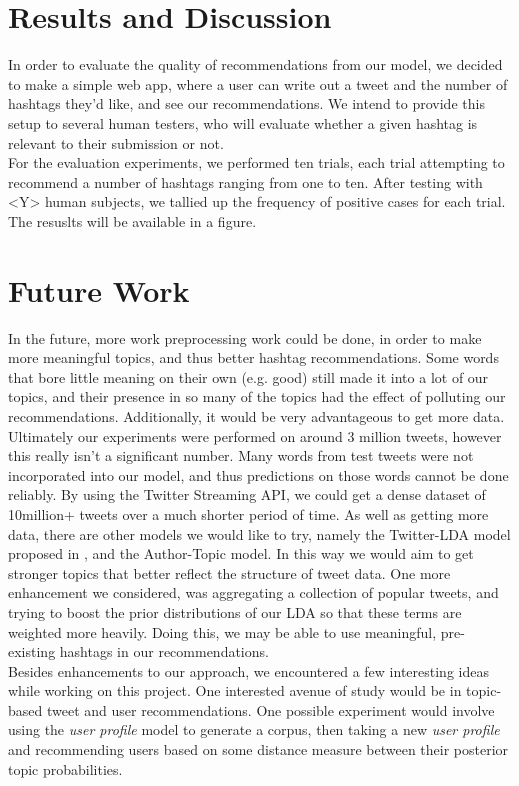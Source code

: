 \documentclass{acm_proc_article-sp}
\begin{document}
\section{Results and Discussion}
\hspace*{5mm}In order to evaluate the quality of recommendations from our model, we decided to make a  simple web app, where a user can write out a tweet and the number of hashtags they'd like, and see our recommendations. We intend to provide this setup to several human testers, who will evaluate whether a given hashtag is relevant to their submission or not.\\
\hspace*{5mm}For the evaluation experiments, we performed ten trials, each trial attempting to recommend a number of hashtags ranging from one to ten. After testing with <Y> human subjects, we tallied up the frequency of positive cases for each trial. The resuslts will be available in a figure. \\

\section{Future Work}
\hspace*{5mm}In the future, more work preprocessing work could be done, in order to make more meaningful topics, and thus better hashtag recommendations. Some words that bore little meaning on their own (e.g. good) still made it into a lot of our topics, and their presence in so many of the topics had the effect of polluting our recommendations. Additionally, it would be very advantageous to get more data. Ultimately our experiments were performed on around 3 million tweets, however this really isn't a significant number. Many words from test tweets were not incorporated into our model, and thus predictions on those words cannot be done reliably. By using the Twitter Streaming API, we could get a dense dataset of 10million+ tweets over a much shorter period of time. As well as getting more data, there are other models we would like to try, namely the Twitter-LDA model proposed in \cite{zhao2011comparing}, and the Author-Topic model. In this way we would aim to get stronger topics that better reflect the structure of tweet data. One more enhancement we considered, was aggregating a collection of popular tweets, and trying to boost the prior distributions of our LDA so that these terms are weighted more heavily. Doing this, we may be able to use meaningful, pre-existing hashtags in our recommendations.\\
\hspace*{5mm}Besides enhancements to our approach, we encountered a few interesting ideas while working on this project. One interested avenue of study would be in topic-based tweet and user recommendations. One possible experiment would involve using the \textit{user profile} model to generate a corpus, then taking a new \textit{user profile} and recommending users based on some distance measure between their posterior topic probabilities.
\end{document}
